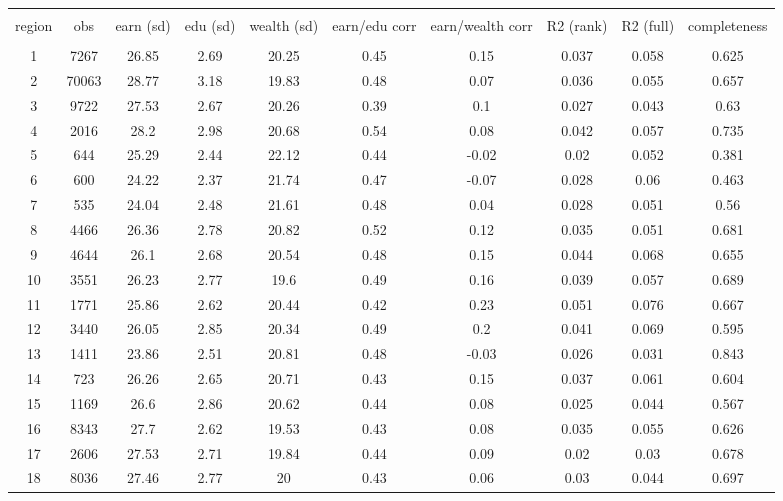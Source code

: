 
\begin{tabular}{@{\extracolsep{2pt}} cccccccccc} 
\\[-1.8ex]\hline 
\hline \\[-1.8ex] 
region & obs & earn (sd) & edu (sd) & wealth (sd) & earn/edu corr & earn/wealth corr & R2 (rank) & R2 (full) & completeness \\ 
\hline \\[-1.8ex] 
1 & 7267 & 26.85 & 2.69 & 20.25 & 0.45 & 0.15 & 0.037 & 0.058 & 0.625 \\ 
2 & 70063 & 28.77 & 3.18 & 19.83 & 0.48 & 0.07 & 0.036 & 0.055 & 0.657 \\ 
3 & 9722 & 27.53 & 2.67 & 20.26 & 0.39 & 0.1 & 0.027 & 0.043 & 0.63 \\ 
4 & 2016 & 28.2 & 2.98 & 20.68 & 0.54 & 0.08 & 0.042 & 0.057 & 0.735 \\ 
5 & 644 & 25.29 & 2.44 & 22.12 & 0.44 & -0.02 & 0.02 & 0.052 & 0.381 \\ 
6 & 600 & 24.22 & 2.37 & 21.74 & 0.47 & -0.07 & 0.028 & 0.06 & 0.463 \\ 
7 & 535 & 24.04 & 2.48 & 21.61 & 0.48 & 0.04 & 0.028 & 0.051 & 0.56 \\ 
8 & 4466 & 26.36 & 2.78 & 20.82 & 0.52 & 0.12 & 0.035 & 0.051 & 0.681 \\ 
9 & 4644 & 26.1 & 2.68 & 20.54 & 0.48 & 0.15 & 0.044 & 0.068 & 0.655 \\ 
10 & 3551 & 26.23 & 2.77 & 19.6 & 0.49 & 0.16 & 0.039 & 0.057 & 0.689 \\ 
11 & 1771 & 25.86 & 2.62 & 20.44 & 0.42 & 0.23 & 0.051 & 0.076 & 0.667 \\ 
12 & 3440 & 26.05 & 2.85 & 20.34 & 0.49 & 0.2 & 0.041 & 0.069 & 0.595 \\ 
13 & 1411 & 23.86 & 2.51 & 20.81 & 0.48 & -0.03 & 0.026 & 0.031 & 0.843 \\ 
14 & 723 & 26.26 & 2.65 & 20.71 & 0.43 & 0.15 & 0.037 & 0.061 & 0.604 \\ 
15 & 1169 & 26.6 & 2.86 & 20.62 & 0.44 & 0.08 & 0.025 & 0.044 & 0.567 \\ 
16 & 8343 & 27.7 & 2.62 & 19.53 & 0.43 & 0.08 & 0.035 & 0.055 & 0.626 \\ 
17 & 2606 & 27.53 & 2.71 & 19.84 & 0.44 & 0.09 & 0.02 & 0.03 & 0.678 \\ 
18 & 8036 & 27.46 & 2.77 & 20 & 0.43 & 0.06 & 0.03 & 0.044 & 0.697 \\ 

\end{tabular}
